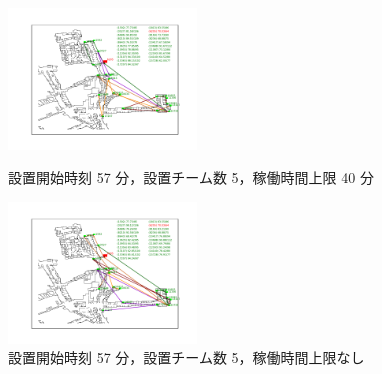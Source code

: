 \documentclass[a4paper,12pt,fleqn]{jarticle}
\begin{document}
\begin{figure}
 \begin{center}
  \begin{minipage}{0.49\hsize}
   \begin{center}
    \includegraphics[width=5cm,trim=100 50 100 50]{fig/57min_5team_lim40min.pdf}
    \caption{設置開始時刻 57 分，\newline \quad 設置チーム数 5，稼働時間上限 40 分}
    \label{fig:57min_5team_lim40min}
   \end{center}
  \end{minipage}
  \begin{minipage}{0.49\hsize}
   \begin{center}
    \includegraphics[width=5cm,trim=100 50 100 50]{fig/57min_5team_nolim.pdf}
    \caption{設置開始時刻 57 分，\newline \quad 設置チーム数 5，稼働時間上限なし}
    \label{fig:57min_5team_nolim}
   \end{center}
  \end{minipage}
 \end{center}
\end{figure}
\end{document}
